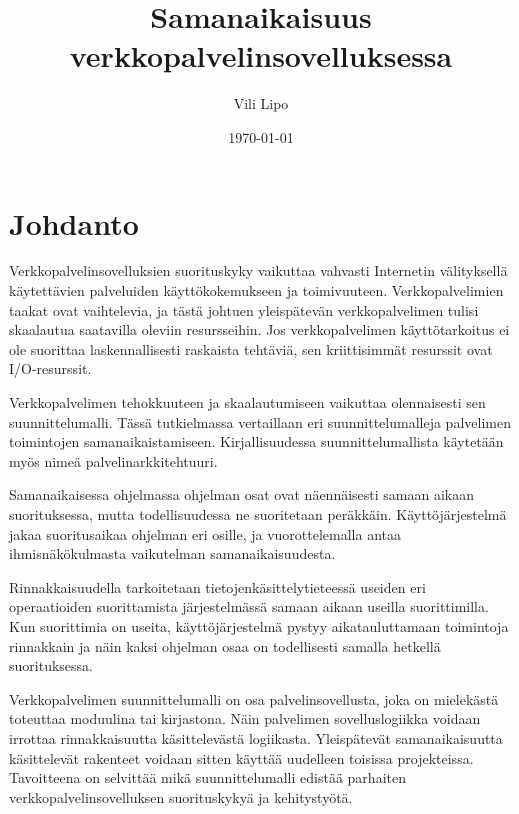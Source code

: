 \documentclass[finnish]{tktltiki2}%
\title{Samanaikaisuus verkkopalvelinsovelluksessa}
\author{Vili Lipo}
\date{\today}
\theoremstyle{definition}
\theoremstyle{remark}
\begin{document}
\frontmatter      %

\maketitle        %
\makeabstract     %

\tableofcontents  %


\mainmatter       %

\section{Johdanto}
Verkkopalvelinsovelluksien suorituskyky vaikuttaa vahvasti
Internetin välityksellä käytettävien palveluiden käyttökokemukseen ja toimivuuteen.
Verkkopalvelimien taakat ovat vaihtelevia, ja tästä johtuen
yleispätevän verkkopalvelimen tulisi skaalautua saatavilla oleviin resursseihin.
Jos verkkopalvelimen käyttötarkoitus ei ole suorittaa laskennallisesti raskaista
tehtäviä, sen
kriittisimmät resurssit ovat I/O-resurssit.

Verkkopalvelimen tehokkuuteen ja skaalautumiseen vaikuttaa olennaisesti
sen suunnittelumalli. Tässä
tutkielmassa vertaillaan eri suunnittelumalleja palvelimen toimintojen samanaikaistamiseen.
Kirjallisuudessa suunnittelumallista käytetään myös nimeä palvelinarkkitehtuuri.

Samanaikaisessa ohjelmassa ohjelman osat ovat näennäisesti samaan
aikaan suorituksessa, mutta todellisuudessa ne suoritetaan peräkkäin.
Käyttöjärjestelmä jakaa suoritusaikaa ohjelman eri osille,
ja vuorottelemalla antaa ihmisnäkökulmasta vaikutelman samanaikaisuudesta.

Rinnakkaisuudella tarkoitetaan tietojenkäsittelytieteessä useiden
eri operaatioiden suorittamista järjestelmässä samaan aikaan useilla suorittimilla.
Kun suorittimia
on useita, käyttöjärjestelmä pystyy aikatauluttamaan toimintoja
rinnakkain ja näin kaksi ohjelman osaa on todellisesti
samalla hetkellä suorituksessa.

Verkkopalvelimen suunnittelumalli on osa palvelinsovellusta,
joka on mielekästä toteuttaa moduulina tai kirjastona.
Näin palvelimen sovelluslogiikka voidaan irrottaa rinnakkaisuutta
käsittelevästä logiikasta. Yleispätevät
samanaikaisuutta käsittelevät rakenteet voidaan sitten
käyttää uudelleen toisissa projekteissa.
Tavoitteena on selvittää mikä suunnittelumalli edistää
parhaiten verkkopalvelinsovelluksen suorituskykyä ja
kehitystyötä.
\end{document}
